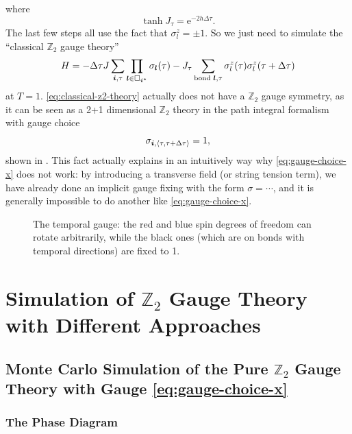\documentclass[hyperref, a4paper]{article}
\newcommand*{\ee}{\mathrm{e}}
\newcommand*{\pair}[1]{\langle #1 \rangle}
\newcommand*{\Ztwo}{$\mathbb{Z}_2$ }
\begin{document}
where 
\begin{equation}
    \tanh J_\tau = \ee^{-2 h \Delta \tau}.
\end{equation}
The last few steps all use the fact that $\sigma^z_l = \pm 1$.
So we just need to simulate the ``classical \Ztwo gauge theory''
\begin{equation}
    H = - \Delta \tau J \sum_{\vb*{i}, \tau} \prod_{\vb*{l} \in \Box_{\vb*{i}^*}} \sigma_{\vb*{l}}(\tau) 
    - J_\tau \sum_{\text{bond $\vb*{l}$}, \tau} \sigma_l^z(\tau) \sigma_l^z(\tau + \Delta \tau)
    \label{eq:classical-z2-theory}
\end{equation}
at $T = 1$. \eqref{eq:classical-z2-theory} actually does not have a \Ztwo gauge symmetry, as it can be seen as a 2+1 dimensional \Ztwo theory in the path integral formalism with gauge choice
\begin{equation}
    \sigma_{\vb*{i}, \pair{\tau, \tau + \Delta \tau}} = 1,
\end{equation}
shown in .
This fact actually explains in an intuitively way why \eqref{eq:gauge-choice-x} does not work:
by introducing a transverse field (or string tension term), we have already done an implicit gauge fixing with the form $\sigma=\cdots$, and it is generally impossible to do another like \eqref{eq:gauge-choice-x}.

\begin{figure}
    \centering
    
    \caption{The temporal gauge: the red and blue spin degrees of freedom can rotate arbitrarily, while the black ones (which are on bonds with temporal directions) are fixed to 1. }
    \label{fig:temporal-gauge}
\end{figure}

\section{Simulation of \Ztwo Gauge Theory with Different Approaches}

\subsection{Monte Carlo Simulation of the Pure \Ztwo Gauge Theory with Gauge \eqref{eq:gauge-choice-x}}

\subsubsection{The Phase Diagram}
\end{document}
